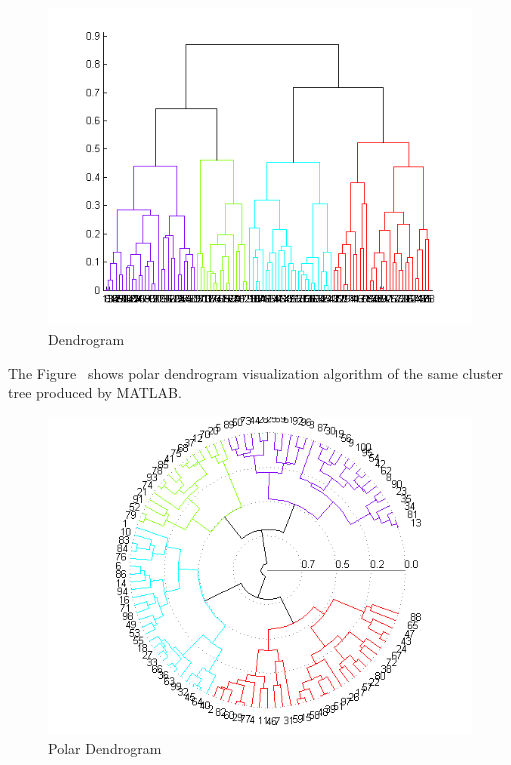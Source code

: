 \documentclass[a4paper,oneside]{article}
\begin{document}
\begin{figure}
\begin{center}
	\includegraphics[scale=1.0]{dendrogram.png}
	\caption{Dendrogram}
	\label{dendrogram_1}
\end{center}
\end{figure}


The Figure~\cite{polardendrogram} shows polar dendrogram visualization algorithm of the same cluster tree produced by MATLAB.

\begin{figure}
\begin{center}
	\includegraphics[scale=1.0]{polardendrogram.png}
	\caption{Polar Dendrogram}
	\label{polardendrogram}
\end{center}
\end{figure}
\end{document}
